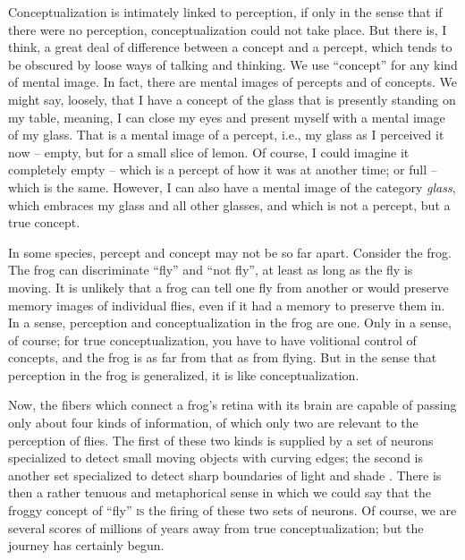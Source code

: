 Conceptualization is intimately linked to perception, if only in the sense that if there were no perception, conceptualization could not take place. But there is, I think, a great deal of difference between a concept and a percept, which tends to be obscured by loose ways of talking and thinking. We use ``concept'' for any kind of mental image. In fact, there are mental images of percepts and of concepts. We might say, loosely, that I have a concept of the glass that is presently standing on my table, meaning, I can close my eyes and present myself with a mental image of my glass. That is a mental image of a percept, i.e., my glass as I perceived it now -- empty, but for a small slice of lemon. Of course, I could imagine it completely empty -- which is a percept of how it was at another time; or full -- which is the same. However, I can also have a mental image of the category \textit{glass}, which embraces
my glass and all other glasses, and which is not a percept, but a true concept.

In some species, percept and concept may not be so far apart. Consider the frog. The frog can discriminate ``fly'' and ``not fly'', at least as long as the fly is moving. It is unlikely that a frog can tell one fly from another or would preserve memory images of individual flies, even if it had a memory to preserve them in. In a sense, perception and conceptualization in the frog are one. Only in a sense, of course; for true conceptualization, you have to have volitional control of concepts, and the frog is as far from that as from flying. But in the sense that perception in the frog is generalized, it is like conceptualization.

Now, the fibers which connect a frog's retina with its brain are capable of passing only about four kinds of information, of which only two are relevant to the perception of flies. The first of these two kinds is supplied by a set of neurons specialized to detect small moving objects with curving edges; the second is another set specialized to detect sharp boundaries of light and shade \citep{Burton1970}. There is then a rather tenuous and metaphorical sense in which we could say that the froggy concept of ``fly'' \textsc{is} the firing of these two sets of neurons. Of course, we are several scores of millions of years away from true conceptualization; but the journey has certainly begun.

